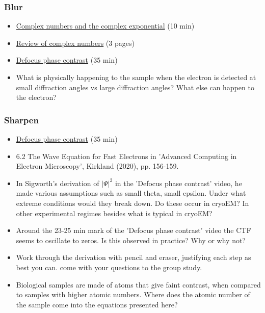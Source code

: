 \documentclass[11pt, oneside]{article}   	%
\begin{document}
\subsubsection{Blur}
\begin{itemize}
\item \href{https://youtu.be/CZkPG95eoS0}{Complex numbers and the complex exponential} (10 min)
\item \href{https://cryoemprinciples.yale.edu/sites/default/files/files/1%20Review%20of%20Complex%20Numbers.pdf}{Review	of complex	numbers} (3 pages)
\item \href{https://youtu.be/m2Hm1ziZFZg}{Defocus phase contrast} (35 min)

\end{itemize}
\begin{itemize}
\item What is physically happening to the sample when the electron is detected at small diffraction angles vs large diffraction angles? What else can happen to the electron?
\end{itemize}

\subsubsection{Sharpen}
\begin{itemize}
	\item \href{https://youtu.be/m2Hm1ziZFZg}{Defocus phase contrast} (35 min)
	\item 6.2 The Wave Equation for Fast Electrons in 'Advanced Computing in Electron Microscopy', Kirkland (2020), pp. 156-159.
\end{itemize}
\begin{itemize}
\item In Sigworth's derivation of $|\Psi|^2$ in the 'Defocus phase contrast' video, he made various assumptions such as small theta, small epsilon. Under what extreme conditions would they break down. Do these occur in cryoEM? In other experimental regimes besides what is typical in cryoEM?
\item Around the 23-25 min mark of the 'Defocus phase contrast' video the CTF seems to oscillate to zeros. Is this observed in practice? Why or why not?
\item Work through the derivation with pencil and eraser, justifying each step as best you can. come with your questions to the group study.
\item Biological samples are made of atoms that give faint contrast, when compared to samples with higher atomic numbers. Where does the atomic number of the sample come into the equations presented here? 
\end{itemize}
\end{document}

